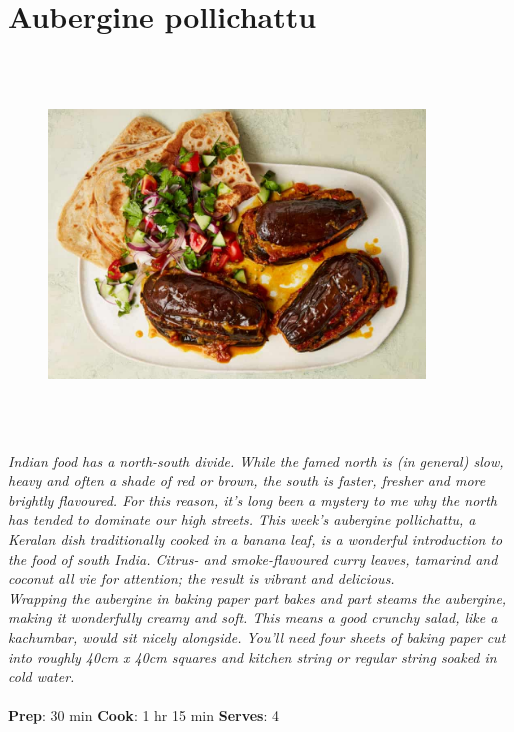 \documentclass{book}
\begin{document}
\section{Aubergine pollichattu}
\begin{figure}
\centering\includegraphics[width=10cm,height=10cm,keepaspectratio]{Recipe_Pictures/Aubergine_pollichattu.png}
\end{figure}
\emph{Indian food has a north-south divide. While the famed north is (in general) slow, heavy and often a shade of red or brown, the south is faster, fresher and more brightly flavoured. For this reason, it’s long been a mystery to me why the north has tended to dominate our high streets. This week’s aubergine pollichattu, a Keralan dish traditionally cooked in a banana leaf, is a wonderful introduction to the food of south India. Citrus- and smoke-flavoured curry leaves, tamarind and coconut all vie for attention; the result is vibrant and delicious.\\ 
Wrapping the aubergine in baking paper part bakes and part steams the aubergine, making it wonderfully creamy and soft. This means a good crunchy salad, like a kachumbar, would sit nicely alongside. You’ll need four sheets of baking paper cut into roughly 40cm x 40cm squares and kitchen string or regular string soaked in cold water.}\\\\ 
\textbf{Prep}: 30 min
\textbf{Cook}: 1 hr 15 min
\textbf{Serves}: 4
\end{document}
